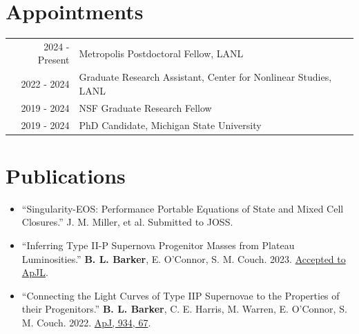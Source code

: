 \documentclass[letterpaper]{deedy-resume} %
\begin{document}
\begin{minipage}[t]{0.63\textwidth} %



\section{Appointments}
\begin{tabular}{rl}
  2024 - Present & Metropolis Postdoctoral Fellow, LANL \\
  2022 - 2024 & Graduate Research Assistant, Center for Nonlinear Studies, LANL \\
  2019 - 2024 & NSF Graduate Research Fellow \\
  2019 - 2024 & PhD Candidate, Michigan State University \\
\end{tabular}

\section{Publications}
\begin{itemize}

        \item ``Singularity-EOS: Performance Portable Equations of State and Mixed Cell Closures.'' J. M. Miller, et al. Submitted to JOSS.

        \item ``Inferring Type II-P Supernova Progenitor Masses from Plateau Luminosities.'' \textbf{B. L. Barker}, E. O'Connor, S. M. Couch. 2023. \href{https://doi.org/10.48550/arXiv.2211.05789}{Accepted to ApJL}.%

        \item ``Connecting the Light Curves of Type IIP Supernovae to the Properties of their Progenitors.'' \textbf{B. L. Barker}, C. E. Harris, M. Warren, E. O'Connor, S. M. Couch. 2022. \href{https://doi.org/10.3847/1538-4357/ac77f3}{ApJ, 934, 67}.%


\end{itemize}
\end{minipage}
\end{document}
